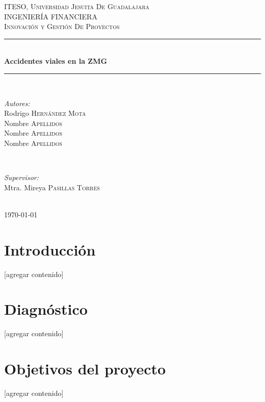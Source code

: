 \documentclass{article}
\begin{document}
\begin{titlepage}
\newcommand{\HRule}{\rule{\linewidth}{0.5mm}}

\center
\textsc{\LARGE ITESO, Universidad Jesuita De Guadalajara}\\[2cm]
\textsc{\Large INGENIERÍA FINANCIERA}\\[1cm]
\textsc{\large Innovación y Gestión De Proyectos}\\[1cm]
\HRule \\[2cm]
{ \huge \bfseries Accidentes viales en la ZMG}\\[2cm] 
\HRule \\[2cm]
\begin{minipage}{0.4\textwidth}
\begin{flushleft} \large


\emph{Autores:}\\
Rodrigo \textsc{Hernández Mota}\\
Nombre \textsc{Apellidos}\\
Nombre \textsc{Apellidos}\\
Nombre \textsc{Apellidos}\\
\end{flushleft}
\end{minipage}
~
\begin{minipage}{0.4\textwidth}
\begin{flushright} \large
\emph{Supervisor:} \\
Mtra. Mireya \textsc{Pasillas Torres}
\end{flushright}
\end{minipage}\\[2cm]

{\large \today}\\[1cm]

\vfill
 
\end{titlepage}
\tableofcontents
\newpage

\section{Introducción}\label{sec:into}
[agregar contenido]

\section{Diagnóstico}\label{sec:diagnostic}
[agregar contenido]

\section{Objetivos del proyecto}\label{sec:objs}
[agregar contenido]
\end{document}
